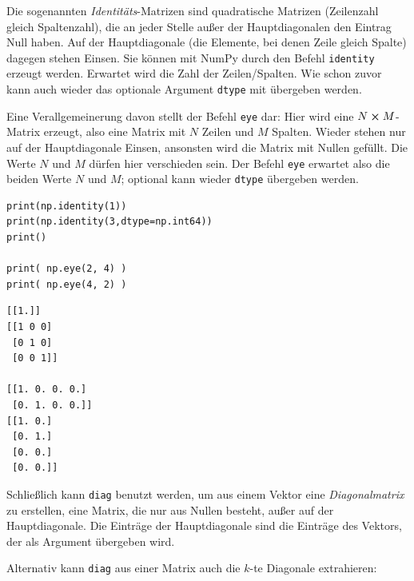 Die sogenannten \emph{Identitäts}-Matrizen sind quadratische Matrizen (Zeilenzahl gleich Spaltenzahl), die an jeder Stelle außer der Hauptdiagonalen den Eintrag Null haben. Auf der Hauptdiagonale (die Elemente, bei denen Zeile gleich Spalte) dagegen stehen Einsen. Sie können mit NumPy durch den Befehl \texttt{identity} erzeugt werden. Erwartet wird die Zahl der Zeilen/Spalten. Wie schon zuvor kann auch wieder das optionale Argument \texttt{dtype} mit übergeben werden.

Eine Verallgemeinerung davon stellt der Befehl \texttt{eye} dar: Hier wird eine $N \cross M$-Matrix erzeugt, also eine Matrix mit $N$ Zeilen und $M$ Spalten. Wieder stehen nur auf der Hauptdiagonale Einsen, ansonsten wird die Matrix mit Nullen gefüllt. Die Werte $N$ und $M$ dürfen hier verschieden sein. Der Befehl \texttt{eye} erwartet also die beiden Werte $N$ und $M$; optional kann wieder \texttt{dtype} übergeben werden.

\begin{tcbraster}[raster columns=2,
                  raster equal height,
                  nobeforeafter,
                  raster column skip=0.5cm]
\begin{codebox}
\begin{verbatim}
print(np.identity(1))
print(np.identity(3,dtype=np.int64))
print()

print( np.eye(2, 4) )
print( np.eye(4, 2) )
\end{verbatim}
\end{codebox}
%
\begin{cmdbox}
\begin{verbatim}
[[1.]]
[[1 0 0]
 [0 1 0]
 [0 0 1]]

[[1. 0. 0. 0.]
 [0. 1. 0. 0.]]
[[1. 0.]
 [0. 1.]
 [0. 0.]
 [0. 0.]]
\end{verbatim}
\end{cmdbox}
\end{tcbraster}

Schließlich kann \texttt{diag} benutzt werden, um aus einem Vektor eine \emph{Diagonalmatrix} zu erstellen, \ie eine Matrix, die nur aus Nullen besteht, außer auf der Hauptdiagonale. Die Einträge der Hauptdiagonale sind die Einträge des Vektors, der als Argument übergeben wird.

Alternativ kann \texttt{diag} aus einer Matrix auch die $k$-te Diagonale extrahieren:

